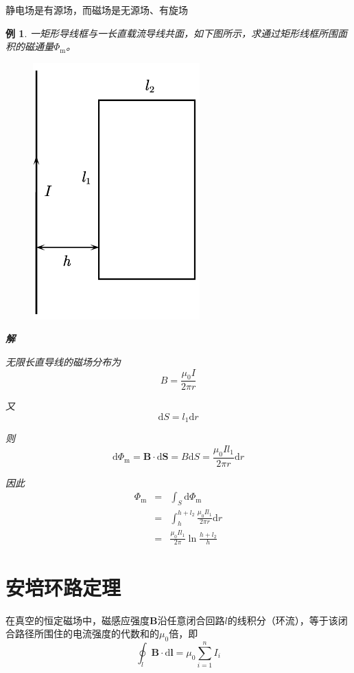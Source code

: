 \documentclass[12pt, a4paper, twoside]{ctexbook}
\newtheorem{example}[theorem]{例}
\begin{document}
静电场是有源场，而磁场是无源场、有旋场

\begin{example}
    一矩形导线框与一长直载流导线共面，如下图所示，求通过矩形线框所围面积的磁通量$\varPhi_\mathrm{m}$。
    \begin{figure}[H]
        \centerline{\includegraphics[scale=0.88]{CH10EX02.pdf}}
    \end{figure}

    \noindent\textbf{解}

    无限长直导线的磁场分布为
    $$
    B=\frac{\mu_0I}{2\pi r}
    $$

    又
    $$
    \mathrm{d}S=l_1\mathrm{d}r
    $$

    则
    $$
    \mathrm{d}\varPhi_\mathrm{m}=\boldsymbol{B}\cdot\mathrm{d}\boldsymbol{S}=B\mathrm{d}S=\frac{\mu_0Il_1}{2\pi r}\mathrm{d}r
    $$

    因此
    \begin{eqnarray}
        \varPhi_\mathrm{m} &=&\int_S\mathrm{d}\varPhi_\mathrm{m} \nonumber \\
        ~&=&\int_{h}^{h+l_2}\frac{\mu_0Il_1}{2\pi r}\mathrm{d}r \nonumber \\
        ~&=&\frac{\mu_0 Il_1}{2\pi}\ln\frac{h+l_2}{h} \nonumber
    \end{eqnarray}
\end{example}
\section{安培环路定理}
在真空的恒定磁场中，磁感应强度$\boldsymbol{B}$沿任意闭合回路$l$的线积分（环流），等于该闭合路径所围住的电流强度的代数和的$\mu_0$倍，即
$$
\oint_l\boldsymbol{B}\cdot\mathrm{d}\boldsymbol{l}=\mu_0\sum_{i=1}^nI_i
$$
\end{document}
